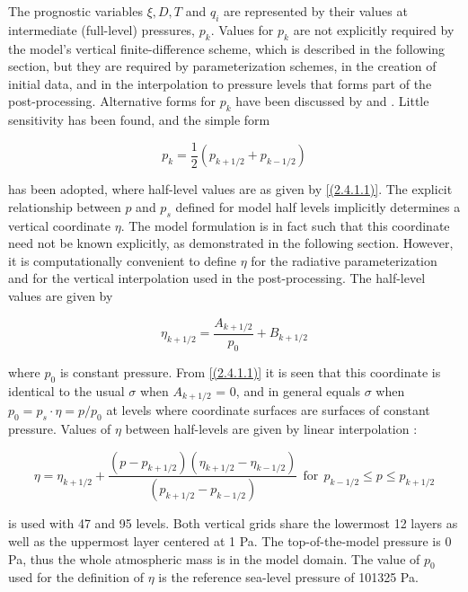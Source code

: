 The prognostic variables $\xi, D, T$ and $q_i$ are represented by
their values at intermediate (full-level) pressures, $p_k$. Values for
$p_k$ are not explicitly required by the model's vertical
finite-difference scheme, which is described in the following section,
but they are required by parameterization schemes, in the creation of
initial data, and in the interpolation to pressure levels that forms
part of the post-processing. Alternative forms for $p_k$ have been
discussed by \cite{simmons81a} and \cite{simmons81b}. Little
sensitivity has been found, and the simple form

\begin{equation}
p_k = \frac{1}{2}(p_{k+1/2}+p_{k-1/2})
\label{(2.4.1.4)}
\end{equation}

has been adopted, where half-level values are as given by
\ref{(2.4.1.1)}. The explicit relationship between $p$ and $p_s$
defined for model half levels implicitly determines a vertical
coordinate $\eta$. The model formulation is in fact such that this
coordinate need not be known explicitly, as demonstrated in the
following section. However, it is computationally convenient to define
$\eta$ for the radiative parameterization and for the vertical
interpolation used in the post-processing. The half-level values are
given by

\begin{equation}
\eta_{k+1/2} = \frac{A_{k+1/2}}{p_0} + B_{k+1/2}
\label{(2.4.1.5)}
\end{equation}

where $p_0$ is constant pressure. From \ref{(2.4.1.1)} it is seen that
this coordinate is identical to the usual $\sigma$ when $A_{k+1/2}$ =
0, and in general equals $\sigma$ when $p_0=p_s\cdot \eta = p/p_0$ at
levels where coordinate surfaces are surfaces of constant
pressure. Values of $\eta$ between half-levels are given by linear
interpolation :

\begin{equation}
\eta = \eta_{k+1/2} + \frac{(p-p_{k+1/2})(\eta_{k+1/2}-\eta_{k-1/2})}
{(p_{k+1/2} - p_{k-1/2})} \ \ \mbox{for} \ \ p_{k-1/2} \leq p \leq p_{k+1/2}
\label{(2.4.1.6)}
\end{equation}

\echam{} is used with 47 and 95 levels. Both vertical grids share the
lowermost 12 layers as well as the uppermost layer centered at 1 Pa. The
top-of-the-model pressure is 0 Pa, thus the whole atmospheric mass is in
the model domain. The value of $p_0$ used for the definition of $\eta$ is
the reference sea-level pressure of 101325 Pa.
\newpage


